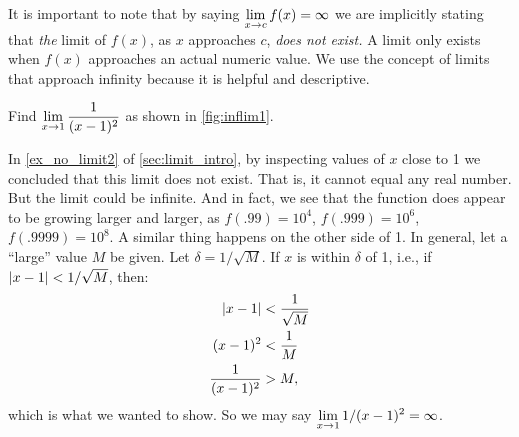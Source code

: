 It is important to note that by saying $\displaystyle \lim_{x\to c}f(x) = \infty$ we are implicitly stating that \emph{the} limit of $f(x)$, as $x$ approaches $c$, \emph{does not exist.} A limit only exists when $f(x)$ approaches an actual numeric value. We use the concept of limits that approach infinity because it is helpful and descriptive.


\begin{example}\label{ex_inflim1}%
Find $\displaystyle \lim_{x\to1}\frac1{(x-1)^2}$ as shown in \autoref{fig:inflim1}.

\solution
In \autoref{ex_no_limit2} of \autoref{sec:limit_intro}, by inspecting values of $x$ close to 1 we concluded that this limit does not exist.  That is, it cannot equal any real number.  But the limit could be infinite.  And in fact, we see that the function does appear to be growing larger and larger, as $f(.99)=10^4$, $f(.999)=10^6$, $f(.9999)=10^8$.  A similar thing happens on the other side of 1.  In general, let a ``large'' value $M$ be given. Let $\delta=1/\sqrt{M}$. If $x$ is within $\delta$ of 1, i.e., if $\left\lvert x-1 \right\rvert<1/\sqrt{M}$, then:\vspace{-.5\baselineskip}
	\begin{align*}
	\left\lvert x-1 \right\rvert &< \frac{1}{\sqrt{M}} \\
	(x-1)^2 &< \frac{1}{M}\\
	\frac{1}{(x-1)^2} &> M,
	\end{align*}
	which is what we wanted to show.  So we may say $\displaystyle\lim_{x\rightarrow 1}1/{(x-1)^2}=\infty$.
\end{example}

